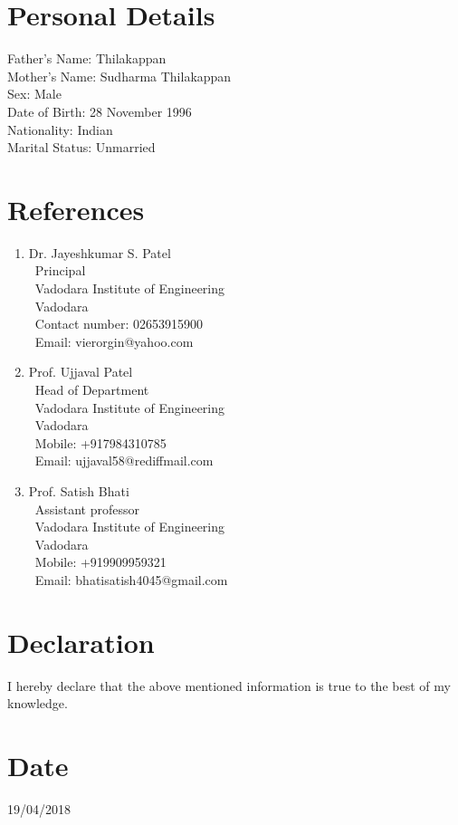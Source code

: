 \documentclass{res}
\begin{document}
\begin{resume}
\begin{itemize}
\end{itemize}
\section{ Personal Details}

 Father's Name: Thilakappan\\ [0.5ex]
 Mother's Name: Sudharma Thilakappan \\ [0.5ex]
 Sex: Male\\ [0.5ex]
 Date of Birth: 28 November 1996\\ [0.5ex]
 Nationality: Indian\\ [0.5ex]
 Marital Status: Unmarried\\ [0.5ex]

\section{References}

\begin{enumerate}

\item Dr. Jayeshkumar S. Patel\\
\ Principal\\
\ Vadodara Institute of Engineering\\
\ Vadodara\\
\ Contact number: 02653915900\\
\ Email: vierorgin@yahoo.com\\

\item Prof. Ujjaval Patel\\
\ Head of Department\\
\ Vadodara Institute of Engineering\\
\ Vadodara\\
\ Mobile: +917984310785\\
\ Email: ujjaval58@rediffmail.com\\


\item Prof. Satish Bhati\\
\ Assistant professor\\
\ Vadodara Institute of Engineering\\
\ Vadodara\\
\ Mobile: +919909959321\\
\ Email: bhatisatish4045@gmail.com\\

\end{enumerate}

\section{Declaration}
 I hereby declare that the above mentioned information is true to the best of my knowledge.

\section{Date}
19/04/2018 
 

\end{resume}
\end{document}
